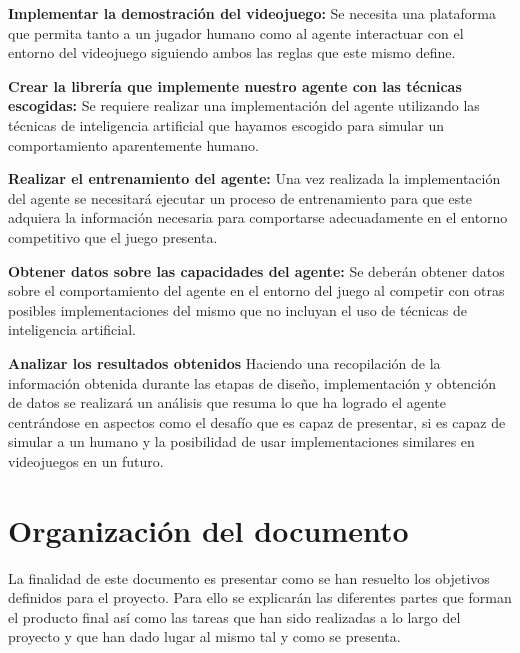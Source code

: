 \begin{enumerate}
	
	{\item {\bf Implementar la demostración del videojuego:}
		Se necesita una plataforma que permita tanto a un jugador humano como al agente interactuar con el entorno del videojuego siguiendo ambos las reglas que este mismo define.
	}

	{\item {\bf Crear la librería que implemente nuestro agente con las técnicas escogidas:}
		Se requiere realizar una implementación del agente utilizando las técnicas de inteligencia artificial que hayamos escogido para simular un comportamiento aparentemente humano.
	}

	{\item {\bf Realizar el entrenamiento del agente:}
		Una vez realizada la implementación del agente se necesitará ejecutar un proceso de entrenamiento para que este adquiera la información necesaria para comportarse adecuadamente en el entorno competitivo que el juego presenta.
	}

	{\item {\bf Obtener datos sobre las capacidades del agente:}
		Se deberán obtener datos sobre el comportamiento del agente en el entorno del juego al competir con otras posibles implementaciones del mismo que no incluyan el uso de técnicas de inteligencia artificial.
	}

	{\item {\bf Analizar los resultados obtenidos}
		Haciendo una recopilación de la información obtenida durante las etapas de diseño, implementación y obtención de datos se realizará un análisis que resuma lo que ha logrado el agente centrándose en aspectos como el desafío que es capaz de presentar, si es capaz de simular a un humano y la posibilidad de usar implementaciones similares en videojuegos en un futuro.
	}
	
\end{enumerate}

\section{Organización del documento}

La finalidad de este documento es presentar como se han resuelto los objetivos definidos para el proyecto. Para ello se explicarán las diferentes partes que forman el producto final así como las tareas que han sido realizadas a lo largo del proyecto y que han dado lugar al mismo tal y como se presenta.

